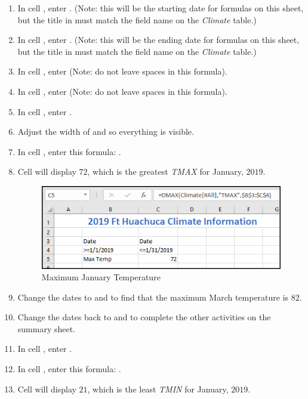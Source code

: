 \begin{enumerate}[resume]
	\item In cell , enter . (Note: this will be the starting date for formulas on this sheet, but the title in  must match the field name on the \textit{Climate} table.)
	\item In cell , enter . (Note: this will be the ending date for formulas on this sheet, but the title in  must match the field name on the \textit{Climate} table.)
	\item In cell , enter  (Note: do not leave spaces in this formula).
	\item In cell , enter  (Note: do not leave spaces in this formula).
	\item In cell , enter .
	\item Adjust the width of  and  so everything is visible.
	\item In cell , enter this formula: .
	\item Cell  will display $ 72 $, which is the greatest \textit{TMAX} for January, $ 2019 $.

	\begin{figure}[H]
		\centering
		\includegraphics[width=\maxwidth{.95\linewidth}]{gfx/ch09_fig86}
		\caption{Maximum January Temperature}
		\label{09:fig86}
	\end{figure}

	\item Change the dates to  and  to find that the maximum March temperature is $ 82 $.
	\item Change the dates back to  and  to complete the other activities on the summary sheet.

	\item In cell , enter .
	\item In cell , enter this formula: .
	\item Cell  will display $ 21 $, which is the least \textit{TMIN} for January, $ 2019 $.


\end{enumerate}
